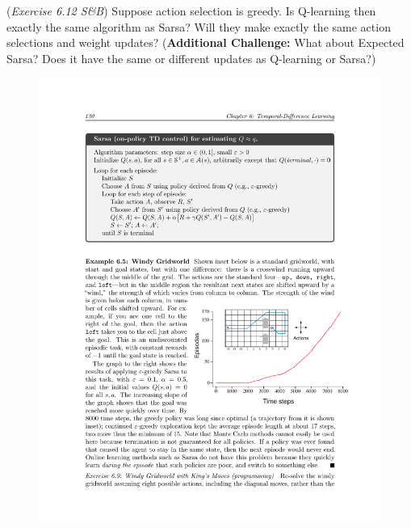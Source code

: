 (\textit{Exercise 6.12 S\&B})
Suppose action selection is greedy. Is Q-learning then exactly the same
algorithm as Sarsa? Will they make exactly the same action selections and weight
updates? (\textbf{Additional Challenge:} What about Expected Sarsa? Does it have the same or different updates as Q-learning or Sarsa?)

\begin{figure}[h!]
  \center
\includegraphics[width=\linewidth]{figures/sarsa.pdf}
\end{figure}

